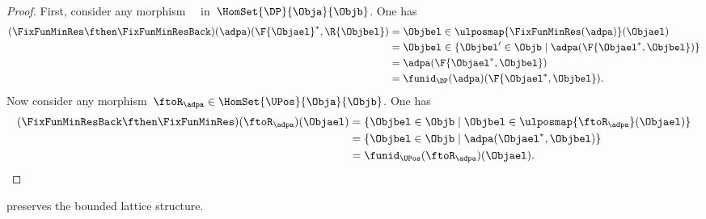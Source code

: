 \begin{proof}
    First, consider any morphism~~ in~$\HomSet{\DP}{\Obja}{\Objb}$.
    One has
    \begin{equation*}
    \begin{aligned}
        (\FixFunMinRes \fthen \FixFunMinResBack)(\adpa)(\F{\Objael}^*,\R{\Objbel})&=
        \Objbel \in \ulposmap{\FixFunMinRes(\adpa)}(\Objael)\\
        &=\Objbel \in \{ \Objbel' \in \Objb \mid \adpa(\F{\Objael^*,\Objbel})\}\\
        &=\adpa(\F{\Objael^*,\Objbel})\\
        &=\funid_\DP(\adpa)(\F{\Objael^*,\Objbel}).
    \end{aligned}
    \end{equation*}
    Now consider any morphism~$\ftoR_\adpa \in \HomSet{\UPos}{\Obja}{\Objb}$.
    One has
    \begin{equation*}
    \begin{aligned}
        (\FixFunMinResBack \fthen \FixFunMinRes)(\ftoR_\adpa)(\Objael)&=
        \{ \Objbel \in \Objb\mid \Objbel \in \ulposmap{\ftoR_\adpa}(\Objael)\}\\
        &=\{ \Objbel \in \Objb\mid \adpa(\Objael^*,\Objbel)\}\\
        &=\funid_\UPos(\ftoR_\adpa)(\Objael).
    \end{aligned}
    \end{equation*}

\end{proof}
\begin{lemma}
    \FixFunMinRes preserves the bounded lattice structure.
\end{lemma}
